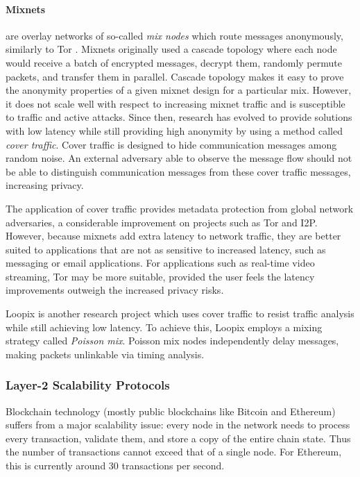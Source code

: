 \paragraph{Mixnets} are overlay networks of so-called \textit{mix nodes} which
route messages anonymously, similarly to Tor \cite{mixnets}. Mixnets originally
used a cascade topology where each node would receive a batch of encrypted messages,
decrypt them, randomly permute packets, and transfer them in parallel. Cascade
topology makes it easy to prove the anonymity properties of a given mixnet
design for a particular mix. However, it does not scale well with respect to
increasing mixnet traffic and is susceptible to traffic and active attacks.
Since then, research has evolved to provide solutions with low latency while
still providing high anonymity by using a method called \textit{cover traffic}. Cover
traffic is designed to hide communication messages among random noise. An
external adversary able to observe the message flow should not be able to
distinguish communication messages from these cover traffic messages, increasing
privacy.

The application of cover traffic provides metadata protection from global network adversaries, a considerable improvement on projects such as Tor and I2P.
However, because mixnets add extra latency to network traffic, they are better suited to
applications that are not as sensitive to increased latency, such as messaging
or email applications. For applications such as real-time video streaming, Tor may be more suitable, provided the user feels the latency improvements outweigh the increased privacy risks.

Loopix \cite{loopix} is another research project which uses cover traffic to
resist traffic analysis while still achieving low latency. To achieve this, Loopix
employs a mixing strategy called \textit{Poisson mix}. Poisson mix nodes
independently delay messages, making packets unlinkable via timing analysis.


\subsubsection{Layer-2 Scalability Protocols}
\label{sec:l2protocols}

Blockchain technology (mostly public blockchains like Bitcoin and Ethereum) suffers from a major scalability issue: every node in the network needs to process every transaction, validate them, and store a copy of the entire chain state. Thus the number of transactions cannot exceed that of a single node. For Ethereum, this is currently around 30 transactions per second.

